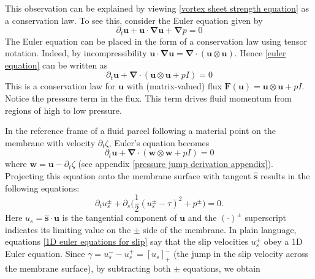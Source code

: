 \documentclass{article}[12pt]
\theoremstyle{Theorem}
\begin{document}
This observation can be explained by viewing \eqref{vortex sheet strength equation} as a conservation law. To see this, consider the Euler equation given by 
\begin{equation}
    \partial_t\boldsymbol{u} + \boldsymbol{u}\cdot\boldsymbol{\nabla}\boldsymbol{u} + \boldsymbol{\nabla}p = 0
    \label{euler equation}
\end{equation}
The Euler equation can be placed in the form of a conservation law using tensor notation. Indeed, by incompressibility $\boldsymbol{u}\cdot\boldsymbol{\nabla}\boldsymbol{u} = \boldsymbol{\nabla}\cdot(\boldsymbol{u}\otimes\boldsymbol{u})$. Hence \eqref{euler equation} can be written as 
\begin{equation}
     \partial_t\boldsymbol{u} + \boldsymbol{\nabla}\cdot(\boldsymbol{u}\otimes\boldsymbol{u} + pI) = 0
     \label{euler equation as conservation law}
\end{equation}
This is a conservation law for $\boldsymbol{u}$ with (matrix-valued) flux $\boldsymbol{F}(\boldsymbol{u}) = \boldsymbol{u}\otimes\boldsymbol{u} + pI$. Notice the pressure term in the flux. This term drives fluid momentum from regions of high to low pressure.
\newline

In the reference frame of a fluid parcel following a material point on the membrane with velocity $\partial_t\zeta$, Euler's equation becomes
\begin{equation}
     \partial_t\boldsymbol{u} + \boldsymbol{\nabla}\cdot(\boldsymbol{w}\otimes\boldsymbol{w} + pI) = 0
     \label{euler equation as conservation law in reference frame}
\end{equation}
where $\boldsymbol{w} = \boldsymbol{u} - \partial_t\zeta$ (see appendix \ref{pressure jump derivation appendix}). Projecting this equation onto the membrane surface with tangent $\hat{\boldsymbol{s}}$ results in the following equations:
\begin{equation}
    \partial_t u^\pm_s +\partial_s\big(\frac{1}{2}(u_s^\pm - \tau)^2 + p^\pm \big) = 0.
    \label{1D euler equations for slip}
\end{equation} 
Here $u_s = \hat{\boldsymbol{s}}\cdot\boldsymbol{u}$ is the tangential component of $\boldsymbol{u}$ and the $(\cdot)^\pm$ superscript indicates its limiting value on the $\pm$ side of the membrane. In plain language, equations \eqref{1D euler equations for slip} say that the slip velocities $u_s^\pm$ obey a 1D Euler equation. Since $\gamma = u_s^- - u_s^+=[u_s]^-_+$ (the jump in the slip velocity across the membrane surface), by subtracting both $\pm$ equations, we obtain 
\end{document}
